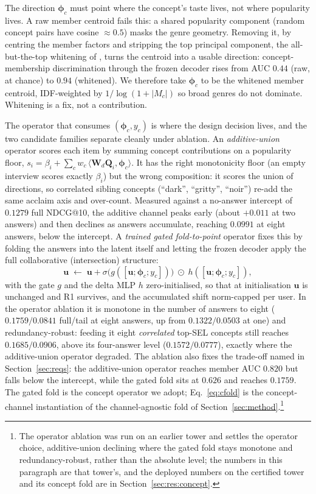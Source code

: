\documentclass[manuscript,screen]{acmart}
\newcommand{\Q}{\mathbf{Q}}
\newcommand{\W}{\mathbf{W}}
\newcommand{\uu}{\mathbf{u}}
\newcommand{\bphi}{\boldsymbol{\phi}}
\begin{document}
The direction $\bphi_c$ must point where the concept's taste lives, not where popularity lives. A raw member centroid fails this: a shared popularity component (random concept pairs have cosine $\approx 0.5$) masks the genre geometry. Removing it, by centring the member factors and stripping the top principal component, the all-but-the-top whitening of \citet{mu2018allbutthetop}, turns the centroid into a usable direction: concept-membership discrimination through the frozen decoder rises from AUC $0.44$ (raw, at chance) to $0.94$ (whitened). We therefore take $\bphi_c$ to be the whitened member centroid, IDF-weighted by $1/\log(1+|M_c|)$ so broad genres do not dominate. Whitening is a fix, not a contribution.

The operator that consumes $(\bphi_c,y_c)$ is where the design decision lives, and the two candidate families separate cleanly under ablation. An \emph{additive-union} operator scores each item by summing concept contributions on a popularity floor, $s_i=\beta_i+\sum_c w_c\,\langle \W_d\Q_i,\bphi_c\rangle$. It has the right monotonicity floor (an empty interview scores exactly $\beta_i$) but the wrong composition: it scores the union of directions, so correlated sibling concepts (``dark'', ``gritty'', ``noir'') re-add the same acclaim axis and over-count. Measured against a no-answer intercept of $0.1279$ full NDCG@10, the additive channel peaks early (about $+0.011$ at two answers) and then declines as answers accumulate, reaching $0.0991$ at eight answers, below the intercept. A \emph{trained gated fold-to-point} operator fixes this by folding the answers into the latent itself and letting the frozen decoder apply the full collaborative (intersection) structure:
\begin{equation}\label{eq:cfold}
  \uu \;\leftarrow\; \uu + \sigma\!\bigl(g([\uu;\bphi_c;y_c])\bigr)\;\odot\;h([\uu;\bphi_c;y_c]),
\end{equation}
with the gate $g$ and the delta MLP $h$ zero-initialised, so that at initialisation $\uu$ is unchanged and R1 survives, and the accumulated shift norm-capped per user. In the operator ablation it is monotone in the number of answers to eight ($0.1759/0.0841$ full/tail at eight answers, up from $0.1322/0.0503$ at one) and redundancy-robust: feeding it eight \emph{correlated} top-SEL concepts still reaches $0.1685/0.0906$, above its four-answer level ($0.1572/0.0777$), exactly where the additive-union operator degraded. The ablation also fixes the trade-off named in Section~\ref{sec:reqs}: the additive-union operator reaches member AUC $0.820$ but falls below the intercept, while the gated fold sits at $0.626$ and reaches $0.1759$. The gated fold is the concept operator we adopt; Eq.~\eqref{eq:cfold} is the concept-channel instantiation of the channel-agnostic fold of Section~\ref{sec:method}.\footnote{The operator ablation was run on an earlier tower and settles the operator choice, additive-union declining where the gated fold stays monotone and redundancy-robust, rather than the absolute level; the numbers in this paragraph are that tower's, and the deployed numbers on the certified tower and its concept fold are in Section~\ref{sec:res:concept}.}
\end{document}
